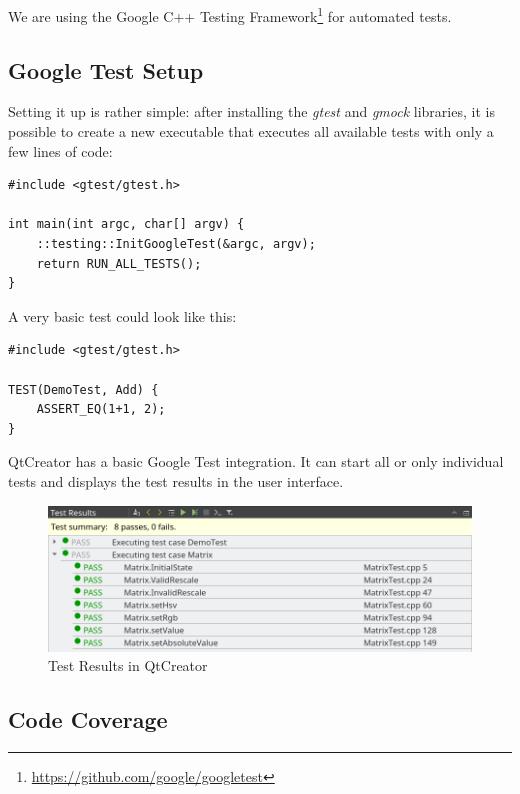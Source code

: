 \documentclass{scrreprt}
\begin{document}

We are using the Google C++ Testing Framework\footnote{\url{https://github.com/google/googletest}} for automated tests.

\subsection{Google Test Setup}

Setting it up is rather simple: after installing the \textit{gtest} and \textit{gmock} libraries, it is possible to create a new executable that executes all available tests with only a few lines of code:

\bigskip
\begin{lstlisting}[title=tests/main.cpp]
#include <gtest/gtest.h>

int main(int argc, char[] argv) {
	::testing::InitGoogleTest(&argc, argv);
	return RUN_ALL_TESTS();
}
\end{lstlisting}
\bigskip

A very basic test could look like this:

\bigskip
\begin{lstlisting}[title=tests/Demo.cpp]
#include <gtest/gtest.h>

TEST(DemoTest, Add) {
	ASSERT_EQ(1+1, 2);
}
\end{lstlisting}
\bigskip

QtCreator has a basic Google Test integration. It can start all or only individual tests and displays the test results in the user interface.

\begin{figure}[h]
	\centering
	\includegraphics[width=1.0\textwidth]{img/qtcreator_test_results}
	\caption[QtCreator Test Results]{Test Results in QtCreator}
	\label{fig:qtcreator_test_results}
\end{figure}

\subsection{Code Coverage}
\end{document}
